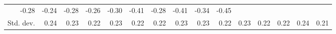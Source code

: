 \begin{tabular}{lllllllllllllll}
  \multicolumn{1}{r}{-0.28} &
  \multicolumn{1}{r}{-0.24} &
  \multicolumn{1}{r}{-0.28} &
  \multicolumn{1}{r}{-0.26} &
  \multicolumn{1}{r}{-0.30} &
  \multicolumn{1}{r}{-0.41} &
  \multicolumn{1}{r}{-0.28} &
  \multicolumn{1}{r}{-0.41} &
  \multicolumn{1}{r}{-0.34} &
  \multicolumn{1}{r}{-0.45} \\
\multicolumn{1}{l}{\hspace{2em}Std. dev.} &
  \multicolumn{1}{|r}{0.24} &
  \multicolumn{1}{r}{0.23} &
  \multicolumn{1}{r}{0.22} &
  \multicolumn{1}{r}{0.23} &
  \multicolumn{1}{r}{0.22} &
  \multicolumn{1}{r}{0.22} &
  \multicolumn{1}{r}{0.23} &
  \multicolumn{1}{r}{0.23} &
  \multicolumn{1}{r}{0.22} &
  \multicolumn{1}{r}{0.23} &
  \multicolumn{1}{r}{0.22} &
  \multicolumn{1}{r}{0.22} &
  \multicolumn{1}{r}{0.24} &
  \multicolumn{1}{r}{0.21} \\
\cline{1-15}
\end{tabular}
